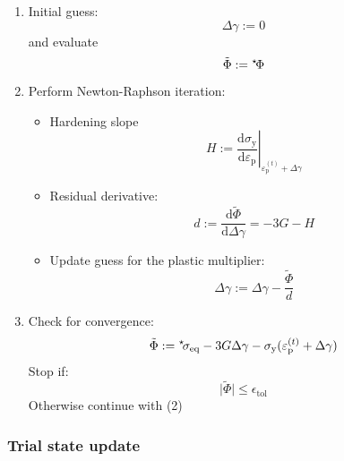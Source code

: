 \documentclass[times]{goose-article}
\newcommand\leftstar[1]{\hspace*{-.3em}~^\star\!#1}
\begin{document}
\begin{enumerate}[(1)]
\item Initial guess:
\begin{equation}
  \Delta \gamma
    := 0
\end{equation}
and evaluate
\begin{equation}
  \tilde{\Phi}
    := \leftstar{\Phi}
\end{equation}
\item Perform Newton-Raphson iteration:
\begin{itemize}
\item Hardening slope
\begin{equation}
  H
  := \left.
     \frac{
       \mathrm{d} \sigma_\mathrm{y}
     }{
       \mathrm{d} \varepsilon_\mathrm{p}
     }
     \right|_{\varepsilon_\mathrm{p}^{(t)} + \Delta \gamma}
\end{equation}
\item Residual derivative:
\begin{equation}
  d := \frac{\mathrm{d} \tilde{\Phi}}{\mathrm{d} \Delta \gamma}
     = -3G - H
\end{equation}
\item Update guess for the plastic multiplier:
\begin{equation}
  \Delta \gamma := \Delta \gamma - \frac{\tilde{\Phi}}{d}
\end{equation}
\end{itemize}
\item Check for convergence:
\begin{equation}
\tilde{\Phi}
  := \leftstar{\sigma}_\mathrm{eq}
   - 3 G \Delta \gamma
   - \sigma_\mathrm{y} ( \varepsilon_\mathrm{p}^{(t)} + \Delta \gamma )
\end{equation}
Stop if:
\begin{equation}
  \big| \tilde{\Phi} \big| \leq \epsilon_\mathrm{tol}
\end{equation}
Otherwise continue with (2)
\end{enumerate}

\subsubsection{Trial state update}
\end{document}
